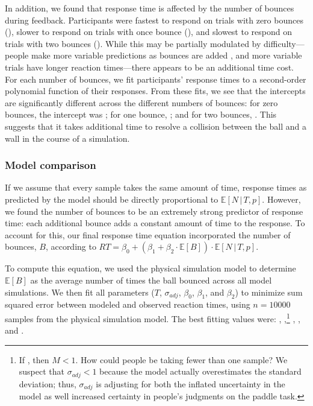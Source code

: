 \documentclass[10pt,letterpaper]{article}
\begin{document}
In addition, we found that response time is affected by the number of bounces during feedback.
Participants were fastest to respond on trials with zero bounces (\RTZeroBounces{}), slower to respond on trials with once bounce (\RTOneBounces{}), and slowest to respond on trials with two bounces (\RTTwoBounces{}).
While this may be partially modulated by difficulty---people make more variable predictions as bounces are added \cite{Smith:2013fc}, and more variable trials have longer reaction times---there appears to be an additional time cost.
For each number of bounces, we fit participants' response times to a second-order polynomial function of their responses.
From these fits, we see that the intercepts are significantly different across the different numbers of bounces: for zero bounces, the intercept was \InterceptZeroBounces{}; for one bounce, \InterceptOneBounces{}; and for two bounces, \InterceptTwoBounces{}.
This suggests that it takes additional time to resolve a collision between the ball and a wall in the course of a simulation.

\subsubsection{Model comparison}

If we assume that every sample takes the same amount of time, response times as predicted by the model should be directly proportional to $\mathbb{E}[N\,|\,T,p]$.
However, we found the number of bounces to be an extremely strong predictor of response time: each additional bounce adds a constant amount of time to the response.
To account for this, our final response time equation incorporated the number of bounces, $B$, according to $RT = \beta_0 + (\beta_1 + \beta_2\cdot{}\mathbb{E}[B]) \cdot{}\mathbb{E}[N\,|\,T,p]$.

To compute this equation, we used the physical simulation model to determine $\mathbb{E}[B]$ as the average number of times the ball bounced across all model simulations.
We then fit all parameters ($T$, $\sigma_{adj}$, $\beta_0$, $\beta_1$, and $\beta_2$) to minimize sum squared error between modeled and observed reaction times, using $n=10000$ samples from the physical simulation model.
The best fitting values were: \threshold{}, \sdadj{},\footnote{If \sdadj{}, then $M<1$. How could people be taking fewer than one sample?
We suspect that $\sigma_{adj}<1$ because the model actually overestimates the standard deviation; thus, $\sigma_{adj}$ is adjusting for both the inflated uncertainty in the model as well increased certainty in people's judgments on the paddle task.} \betazero{}, \betaone{}, and \betatwo{}.
\end{document}

